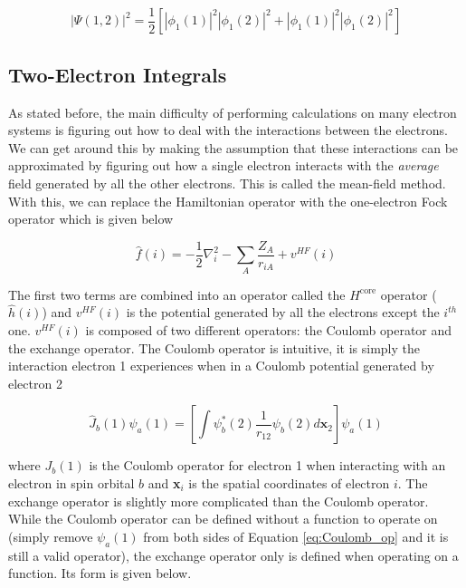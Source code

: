 \begin{equation}
\label{eq:el_prob_dist_4}
|\Psi(1,2)|^{2} =
\frac{1}{2}
\left[
|\phi_{1}(1)|^{2}|\phi_{1}(2)|^{2} + |\phi_{1}(1)|^{2}|\phi_{1}(2)|^{2}
\right]
\end{equation}

\subsection{Two-Electron Integrals}
As stated before, the main difficulty of performing calculations on many electron systems is figuring out how to deal with the interactions between the electrons. We can get around this by making the assumption that these interactions can be approximated by figuring out how a single electron interacts with the \textit{average} field generated by all the other electrons. This is called the mean-field method\cite{RHF}. With this, we can replace the Hamiltonian operator with the one-electron Fock operator which is given below\cite{Ostlund}

\begin{equation}
\label{eq:fock_op}
\hat{f}(i) = -\frac{1}{2}\nabla^{2}_{i}  - \sum_{A}\frac{Z_{A}}{r_{iA}} + v^{HF}(i)
\end{equation} 

The first two terms are combined into an operator called the $H^{\text{core}}$ operator ($\hat{h}(i)$) and $v^{HF}(i)$ is the potential generated by all the electrons except the $i^{th}$ one. $v^{HF}(i)$ is composed of two different operators: the Coulomb operator and the exchange operator. The Coulomb operator is intuitive, it is simply the interaction electron 1 experiences when in a Coulomb potential generated by electron 2

\begin{equation}
\label{eq:Coulomb_op}
\hat{J}_{b}(1)\psi_{a}(1)=\left[\int\psi^{*}_{b}(2)\frac{1}{r_{12}}\psi_{b}(2)d\textbf{x}_{2}\right]\psi_{a}(1)
\end{equation} 

where $J_{b}(1)$ is the Coulomb operator for electron 1 when interacting with an electron in spin orbital $b$ and \textbf{x}$_{i}$ is the spatial coordinates of electron $i$. The exchange operator is slightly more complicated than the Coulomb operator. While the Coulomb operator can be defined without a function to operate on (simply remove $\psi_{a}(1)$ from both sides of Equation \ref{eq:Coulomb_op} and it is still a valid operator), the exchange operator only is defined when operating on a function. Its form is given below.

